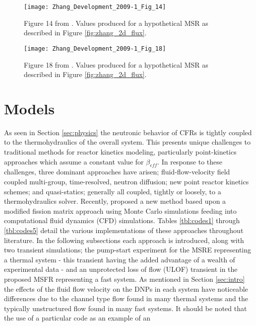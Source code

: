 \documentclass[review]{elsarticle}
\begin{document}
\begin{figure}[H]
   \centering
   \texttt{[image: Zhang\_Development\_2009-1\_Fig\_14]}
   \caption{Figure 14 from \cite{zhang_development_2009-1}. Values produced for a hypothetical
   MSR as described in Figure \ref{fig:zhang_2d_flux}.}
   \label{fig:zhang_velocity_keff}
\end{figure}

\begin{figure}[H]
   \centering
   \texttt{[image: Zhang\_Development\_2009-1\_Fig\_18]}
   \caption{Figure 18 from \cite{zhang_development_2009-1}. Values produced for a hypothetical MSR
   as described in Figure \ref{fig:zhang_2d_flux}.} 
   \label{fig:zhang_residence_time_keff}
\end{figure}

\section{Models} \label{sec:models}
As seen in Section \ref{sec:physics} the neutronic behavior of CFRs is tightly
coupled to the thermohydraulics of the overall system. This presents unique
challenges to traditional methods for reactor kinetics modeling, particularly
point-kinetics approaches which assume a constant value for $\beta_{eff}$. In
response to these challenges, three dominant approaches have arisen; 
fluid-flow-velocity field coupled multi-group, time-resolved, neutron diffusion;
new point reactor kinetics schemes; and quasi-statics; generally all coupled, tightly
or loosely, to a thermohydraulics solver. Recently,
\cite{laureau_coupled_2015} proposed a new method based upon a modified
fission matrix approach using Monte Carlo simulations feeding into
computational fluid dynamics (CFD) simulations. Tables \ref{tbl:codes1}
through \ref{tbl:codes5} detail
the various implementations of these approaches throughout literature.
In the following subsections
each approach is introduced, along with two transient simulations; the pump-start
experiment for the MSRE representing a thermal system - this transient having
the added advantage of a wealth of experimental data - and an unprotected loss
of flow (ULOF) transient in the proposed MSFR representing a fast system.
As mentioned in
Section \ref{sec:intro} the effects of the fluid flow velocity on the DNPs in each
system have noticeable differences due to the channel type flow found in many
thermal systems and the typically unstructured flow found in many fast
systems.
It should be noted that the use of a particular code as an example of an
\end{document}
